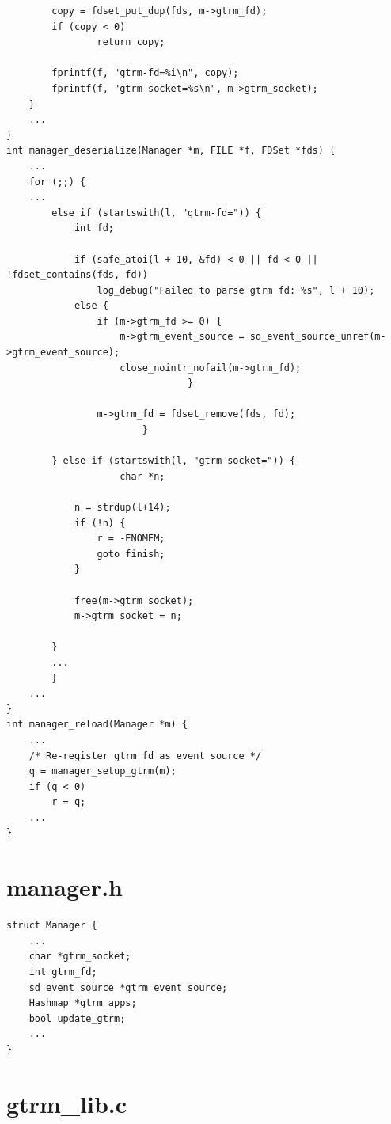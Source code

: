 \documentclass[nobiblatex]{LTHthesis}
\begin{document}
\begin{lstlisting}
		copy = fdset_put_dup(fds, m->gtrm_fd);
		if (copy < 0)
				return copy;

		fprintf(f, "gtrm-fd=%i\n", copy);
		fprintf(f, "gtrm-socket=%s\n", m->gtrm_socket);
	}
	...
}
int manager_deserialize(Manager *m, FILE *f, FDSet *fds) {
	...
	for (;;) {
	...
		else if (startswith(l, "gtrm-fd=")) {
			int fd;

			if (safe_atoi(l + 10, &fd) < 0 || fd < 0 || !fdset_contains(fds, fd))
				log_debug("Failed to parse gtrm fd: %s", l + 10);
			else {
				if (m->gtrm_fd >= 0) {
					m->gtrm_event_source = sd_event_source_unref(m->gtrm_event_source);
					close_nointr_nofail(m->gtrm_fd);
								}

				m->gtrm_fd = fdset_remove(fds, fd);
						}

		} else if (startswith(l, "gtrm-socket=")) {
					char *n;

			n = strdup(l+14);
			if (!n) {
				r = -ENOMEM;
				goto finish;
			}

			free(m->gtrm_socket);
			m->gtrm_socket = n;

		} 
		...
		}
	...
}
int manager_reload(Manager *m) {
	...
	/* Re-register gtrm_fd as event source */
	q = manager_setup_gtrm(m);
	if (q < 0)
		r = q;
	...
}
\end{lstlisting}
\section{manager.h}
\begin{lstlisting}
struct Manager {
	...
	char *gtrm_socket;
	int gtrm_fd;
	sd_event_source *gtrm_event_source;
	Hashmap *gtrm_apps;
	bool update_gtrm;
	...
}
\end{lstlisting}
\section{gtrm\_lib.c}
\end{document}
